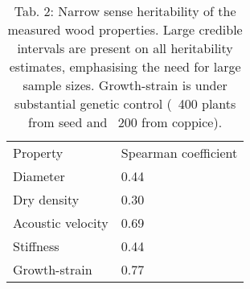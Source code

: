 


\begin{table}
\centering
\caption{Tab. 2: Narrow sense heritability of the measured wood properties. Large credible intervals are present on all heritability estimates, emphasising the need for large sample sizes. Growth-strain is under substantial genetic control (~400 plants from seed and ~200 from coppice).}
\begin{tabular}{ll}
Property          & Spearman coefficient \\
Diameter          & 0.44                 \\
Dry density       & 0.30                 \\
Acoustic velocity & 0.69                 \\
Stiffness         & 0.44                 \\
Growth-strain     & 0.77                
\end{tabular}
\end{table}